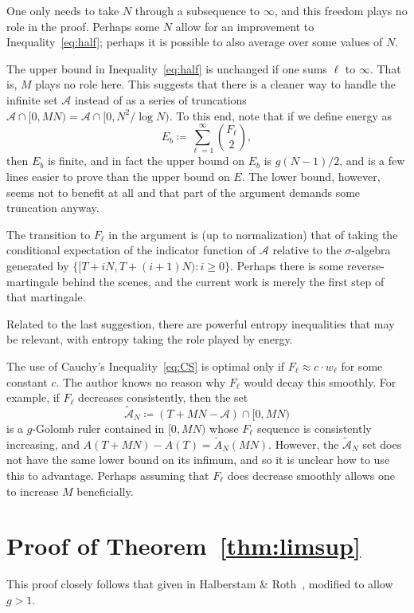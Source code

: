 \documentclass[10pt]{article}
\newcommand{\cA}{\mathcal{A}}
\begin{document}
One only needs to take $N$ through a subsequence to $\infty$, and this freedom plays no role in the proof. Perhaps some $N$ allow for an improvement to Inequality~\eqref{eq:half}; perhaps it is possible to also average over some values of $N$. 

The upper bound in Inequality~\eqref{eq:half} is unchanged if one sums $\ell$ to $\infty$. That is, $M$ plays no role here. This suggests that there is a cleaner way to handle the infinite set $\cA$ instead of as a series of truncations $\cA \cap [0,MN) = \cA \cap [0,N^2/\log N)$. To this end, note that if we define energy as
    \[E_b \coloneqq \sum_{\ell=1}^\infty \binom{F_\ell}{2},\]
then $E_b$ is finite, and in fact the upper bound on $E_b$ is $g (N-1)/2$, and is a few lines easier to prove than the upper bound on $E$. The lower bound, however, seems not to benefit at all and that part of the argument demands some truncation anyway.

The transition to $F_\ell$ in the argument is (up to normalization) that of taking the conditional expectation of the indicator function of $\cA$ relative to the $\sigma$-algebra generated by $\{[T+iN,T+(i+1)N): i\ge 0\}$. Perhaps there is some reverse-martingale behind the scenes, and the current work is merely the first step of that martingale.

Related to the last suggestion, there are powerful entropy inequalities that may be relevant, with entropy taking the role played by energy.

The use of Cauchy's Inequality~\eqref{eq:CS} is optimal only if $F_\ell \approx c\cdot w_\ell$ for some constant $c$. The author knows no reason why $F_\ell$ would decay this smoothly. For example, if $F_\ell$ decreases consistently, then the set
    \[\widetilde{\cA}_N \coloneqq (T+MN-\cA)\cap[0,MN)\]
is a $g$-Golomb ruler contained in $[0,MN)$ whose $F_\ell$ sequence is consistently increasing, and $A(T+MN)-A(T)=\widetilde{A}_N(MN)$. However, the $\widetilde{\cA}_N$ set does not have the same lower bound on its infimum, and so it is unclear how to use this to advantage. Perhaps assuming that $F_\ell$ does decrease smoothly allows one to increase $M$ beneficially.

\section{Proof of Theorem~\ref{thm:limsup}}\label{sec:Proof of limsup}

This proof closely follows that given in Halberstam \& Roth~\cite{1966.Halberstam&Roth}, modified to allow $g >1$.
\end{document}
